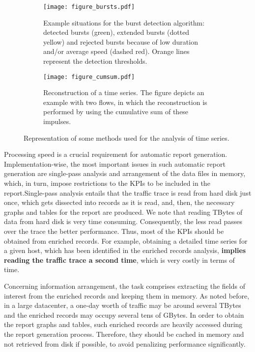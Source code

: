 \documentclass[AMA,STIX1COL]{WileyNJD-v2}
\begin{document}
\begin{figure*}[b]
  \begin{subfigure}[tbp]{0.49\textwidth}
    \centering
    \texttt{[image: figure\_bursts.pdf]}
    \caption{Example situations for the burst detection algorithm: detected bursts (green), extended bursts (dotted yellow) and rejected bursts because of low duration and/or average speed (dashed red). Orange lines represent the detection thresholds.}
    \label{fig:Bursts}
  \end{subfigure}
  \hfill %
  \begin{subfigure}[tbp]{0.49\textwidth}
      \centering
      \texttt{[image: figure\_cumsum.pdf]}
      \vspace{0.2cm}
      \caption{Reconstruction of a time series. The figure depicts an example with two flows, in which the reconstruction is performed by using the cumulative sum of these impulses.}
      \label{fig:cumsum}
  \end{subfigure}
  \caption{Representation of some methods used for the analysis of time series.}
  \label{fig:algorithms}
\end{figure*}

Processing speed is a crucial requirement for automatic report generation. Implementation-wise, the most important issues in such automatic report generation are single-pass analysis and arrangement of the data files in memory, which, in turn, impose restrictions to the KPIs to be included in the report.Single-pass analysis entails that the traffic trace is read from hard disk just once, which gets dissected into records as it is read, and, then, the necessary graphs and tables for the report are produced. We note that reading TBytes of data from hard disk is very time consuming. Consequently, the less read passes over the trace the better performance. Thus, most of the KPIs should be obtained from enriched records. For example, obtaining a detailed time series for a given host, which has been identified in the enriched records analysis, \textbf{implies reading the traffic trace a second time}, which is very costly in terms of time.

Concerning information arrangement, the task comprises extracting the fields of interest from the enriched records and keeping them in memory. As noted before, in a large datacenter, a one-day worth of traffic may be around several TBytes and the enriched records may occupy several tens of GBytes. In order to obtain the report graphs and tables, such enriched records are heavily accessed during the report generation process. Therefore, they should be cached in memory and not retrieved from disk if possible, to avoid penalizing performance significantly.
\end{document}
